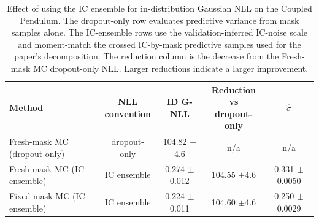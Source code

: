 \begin{table}[t]
\centering
\small
\setlength{\tabcolsep}{3pt}
\caption{Effect of using the IC ensemble for in-distribution Gaussian NLL on the Coupled Pendulum. The dropout-only row evaluates predictive variance from mask samples alone. The IC-ensemble rows use the validation-inferred IC-noise scale and moment-match the crossed IC-by-mask predictive samples used for the paper's decomposition. The reduction column is the decrease from the Fresh-mask MC dropout-only NLL. Larger reductions indicate a larger improvement.}
\label{tab:id-nll-ic-ensemble-effect}
\begin{tabular}{lcccc}
\toprule
Method & \makecell{NLL\\ convention} & ID G-NLL & \makecell{Reduction vs\\ dropout-only} & $\hat\sigma$ \\
\midrule
Fresh-mask MC (dropout-only) & dropout-only & 104.82 {\footnotesize $\pm$4.6} & n/a & n/a \\
Fresh-mask MC (IC ensemble) & IC ensemble & 0.274 {\footnotesize $\pm$0.012} & 104.55 {\footnotesize $\pm$4.6} & 0.331 {\footnotesize $\pm$0.0050} \\
Fixed-mask MC (IC ensemble) & IC ensemble & 0.224 {\footnotesize $\pm$0.011} & 104.60 {\footnotesize $\pm$4.6} & 0.250 {\footnotesize $\pm$0.0029} \\
\bottomrule
\end{tabular}%
\end{table}

